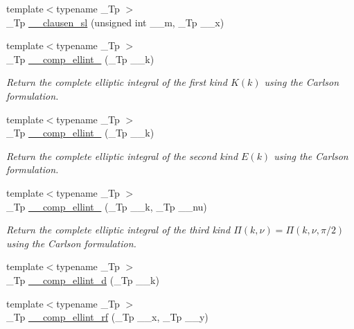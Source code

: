 \begin{DoxyCompactItemize}
\item 
{\footnotesize template$<$typename \+\_\+\+Tp $>$ }\\\+\_\+\+Tp \hyperlink{namespacestd_1_1____detail_a554bb352d6397ea5991400eb3734165f}{\+\_\+\+\_\+clausen\+\_\+sl} (unsigned int \+\_\+\+\_\+m, \+\_\+\+Tp \+\_\+\+\_\+x)
\item 
{\footnotesize template$<$typename \+\_\+\+Tp $>$ }\\\+\_\+\+Tp \hyperlink{namespacestd_1_1____detail_a7b23bcf7e9f20b1e353a047126e13af1}{\+\_\+\+\_\+comp\+\_\+ellint\+\_} (\+\_\+\+Tp \+\_\+\+\_\+k)
\begin{DoxyCompactList}\small\item\em Return the complete elliptic integral of the first kind $ K(k) $ using the Carlson formulation. \end{DoxyCompactList}\item 
{\footnotesize template$<$typename \+\_\+\+Tp $>$ }\\\+\_\+\+Tp \hyperlink{namespacestd_1_1____detail_a4836f4db24abd037705100750f82d375}{\+\_\+\+\_\+comp\+\_\+ellint\+\_} (\+\_\+\+Tp \+\_\+\+\_\+k)
\begin{DoxyCompactList}\small\item\em Return the complete elliptic integral of the second kind $ E(k) $ using the Carlson formulation. \end{DoxyCompactList}\item 
{\footnotesize template$<$typename \+\_\+\+Tp $>$ }\\\+\_\+\+Tp \hyperlink{namespacestd_1_1____detail_a26b35b5d72366d30ac4644db8f2f8be4}{\+\_\+\+\_\+comp\+\_\+ellint\+\_} (\+\_\+\+Tp \+\_\+\+\_\+k, \+\_\+\+Tp \+\_\+\+\_\+nu)
\begin{DoxyCompactList}\small\item\em Return the complete elliptic integral of the third kind $ \Pi(k,\nu) = \Pi(k,\nu,\pi/2) $ using the Carlson formulation. \end{DoxyCompactList}\item 
{\footnotesize template$<$typename \+\_\+\+Tp $>$ }\\\+\_\+\+Tp \hyperlink{namespacestd_1_1____detail_add5220a1ab03915e4a45dc547bb8eef6}{\+\_\+\+\_\+comp\+\_\+ellint\+\_\+d} (\+\_\+\+Tp \+\_\+\+\_\+k)
\item 
{\footnotesize template$<$typename \+\_\+\+Tp $>$ }\\\+\_\+\+Tp \hyperlink{namespacestd_1_1____detail_a41ecec8820344d3575b464ecd4db5171}{\+\_\+\+\_\+comp\+\_\+ellint\+\_\+rf} (\+\_\+\+Tp \+\_\+\+\_\+x, \+\_\+\+Tp \+\_\+\+\_\+y)

\end{DoxyCompactItemize}
